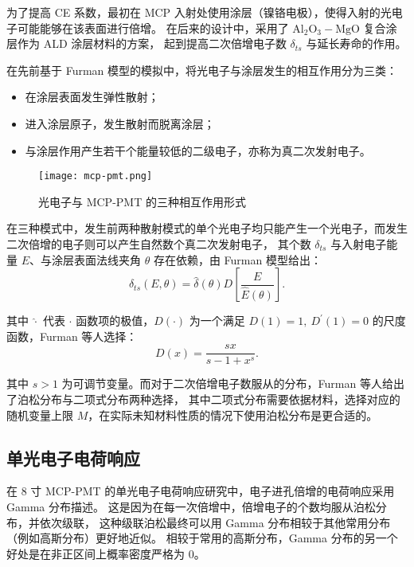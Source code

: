 为了提高 CE 系数，最初在 MCP 入射处使用涂层（镍铬电极），使得入射的光电子可能能够在该表面进行倍增。
在后来的设计中，采用了 $\text{Al}_2\text{O}_3-\text{MgO}$ 复合涂层作为 ALD 涂层材料的方案，
起到提高二次倍增电子数 $\delta_{ts}$ 与延长寿命的作用。

在先前基于 Furman 模型\cite{PhysRevSTAB.5.124404}的模拟\cite{chenOptimizationElectronCollection2016}中，将光电子与涂层发生的相互作用分为三类：
\begin{itemize}
    \item 在涂层表面发生弹性散射；
    \item 进入涂层原子，发生散射而脱离涂层；
    \item 与涂层作用产生若干个能量较低的二级电子，亦称为真二次发射电子。
\end{itemize}

\begin{figure}
    \centering
    \texttt{[image: mcp-pmt.png]}
    \caption{光电子与 MCP-PMT 的三种相互作用形式}
\end{figure}

在三种模式中，发生前两种散射模式的单个光电子均只能产生一个光电子，而发生二次倍增的电子则可以产生自然数个真二次发射电子，
其个数 $\delta_{ts}$ 与入射电子能量 $E$、与涂层表面法线夹角 $\theta$ 存在依赖，由 Furman 模型给出：
\begin{equation}
    \delta_{ts}(E,\theta)=\hat{\delta}(\theta)D\left[\frac{E}{\hat{E}(\theta)}\right].
\end{equation}

其中 $\hat{\cdot}$ 代表 $\cdot$ 函数项的极值，$D(\cdot)$ 为一个满足 $D(1)=1,\ D^\prime(1)=0$ 的尺度函数，Furman 等人选择：
\begin{equation}
    D(x)=\frac{sx}{s-1+x^s}.
\end{equation}

其中 $s>1$ 为可调节变量。而对于二次倍增电子数服从的分布，Furman 等人给出了泊松分布与二项式分布两种选择，
其中二项式分布需要依据材料，选择对应的随机变量上限 $M$，在实际未知材料性质的情况下使用泊松分布是更合适的。

\subsection{单光电子电荷响应}\label{sec:spe-charge}
在 8 寸 MCP-PMT 的单光电子电荷响应研究\cite{wengSingleElectronCharge2024}中，电子进孔倍增的电荷响应采用 Gamma 分布描述。
这是因为在每一次倍增中，倍增电子的个数均服从泊松分布，并依次级联，
这种级联泊松最终可以用 Gamma 分布相较于其他常用分布（例如高斯分布）更好地近似。
相较于常用的高斯分布，Gamma 分布的另一个好处是在非正区间上概率密度严格为 0。

